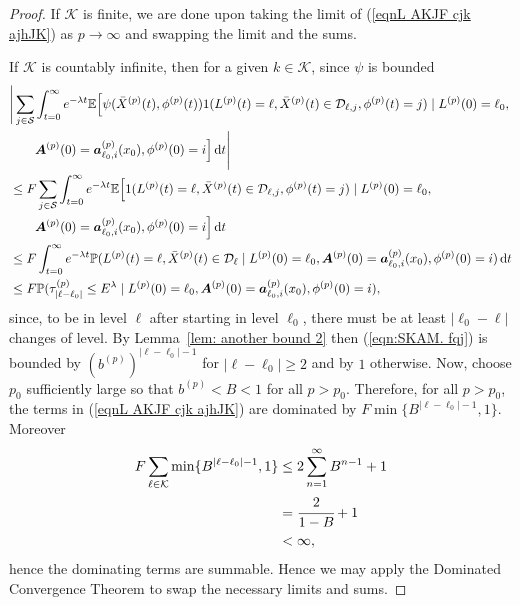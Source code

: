 \begin{proof}
	If \(\mathcal K\) is finite, we are done upon taking the limit of (\ref{eqnL AKJF cjk ajhJK}) as \(p\to\infty\) and swapping the limit and the sums. 
	
	If \(\mathcal K\) is countably infinite, then for a given \(k\in\mathcal K\), since \(\psi\) is bounded
	\begin{align}
		&\Bigg|\sum_{j\in\mathcal S}\int_{t=0}^\infty e^{-\lambda t}\mathbb E\Big[\psi(\bar X^{(p)}(t),\phi^{(p)}(t)) 1(L^{(p)}(t)=\ell, \bar X^{(p)}(t) \in \mathcal D_{\ell,j},\phi^{(p)}(t)=j)  \mid L^{(p)}(0)=\ell_0, \nonumber 
		\\&\qquad{} \boldsymbol A^{(p)}(0)=\boldsymbol  a_{\ell_0,i}^{(p)}(x_0), \phi^{(p)}(0)=i \Big] \, \mathrm{d} t\Bigg| \nonumber 
		\\&\leq F \sum_{j\in\mathcal S}\int_{t=0}^\infty e^{-\lambda t}\mathbb E\Big[ 1(L^{(p)}(t)=\ell, \bar X^{(p)}(t) \in \mathcal D_{\ell,j},\phi^{(p)}(t)=j)  \mid L^{(p)}(0)=\ell_0, \nonumber 
		\\&\qquad{} \boldsymbol A^{(p)}(0)=\boldsymbol  a_{\ell_0,i}^{(p)}(x_0), \phi^{(p)}(0)=i \Big] \, \mathrm{d} t \nonumber 
		\\&\leq F  \int_{t=0}^\infty e^{-\lambda t}\mathbb P( L^{(p)}(t)=\ell, \bar X^{(p)}(t) \in \mathcal D_{\ell} \mid L^{(p)}(0)=\ell_0,  
		\boldsymbol A^{(p)}(0)=\boldsymbol  a_{\ell_0,i}^{(p)}(x_0), \phi^{(p)}(0)=i )\, \mathrm{d} t \nonumber 
		\\&\leq F \mathbb P(\tau_{|\ell-\ell_0|}^{(p)}\leq E^\lambda \mid L^{(p)}(0)=\ell_0,  
			\boldsymbol A^{(p)}(0)=\boldsymbol  a_{\ell_0,i}^{(p)}(x_0), \phi^{(p)}(0)=i), \label{eqn:SKAM. fqj}
	\end{align}
	since, to be in level \(\ell\) after starting in level \(\ell_0\), there must be at least \(|\ell_0-\ell|\) changes of level. By Lemma~\ref{lem: another bound 2} then (\ref{eqn:SKAM. fqj}) is bounded by \(\left(b^{(p)}\right)^{|\ell-\ell_0|-1}\) for \(|\ell-\ell_0|\geq 2\) and by \(1\) otherwise. Now, choose \(p_0\) sufficiently large so that \(b^{(p)}<B<1\) for all \(p>p_0\). Therefore, for all \(p>p_0\), the terms in (\ref{eqnL AKJF cjk ajhJK}) are dominated by \(F\min\{B^{|\ell-\ell_0|-1},1\}\). Moreover 
	\begin{align*}
		F\sum_{\ell\in\mathcal K} \min\{B^{|\ell-\ell_0|-1},1\} 
		&\leq2\sum_{n=1}^\infty B^{n-1}+1
		\\&=\cfrac{2}{1-B}+1
		\\&<\infty,
	\end{align*}
	hence the dominating terms are summable. Hence we may apply the Dominated Convergence Theorem to swap the necessary limits and sums. 
\end{proof}

